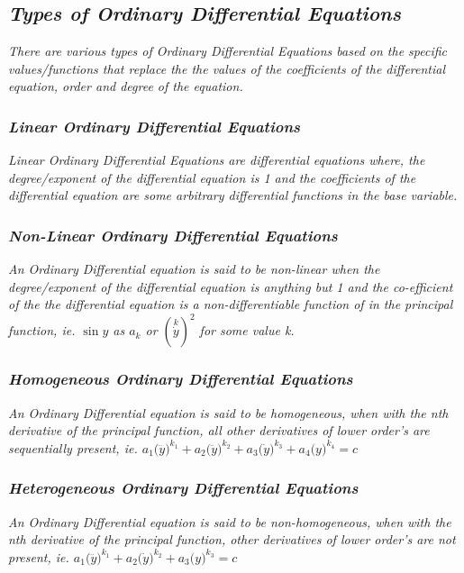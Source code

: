 

\subsection{\textit{Types of Ordinary Differential Equations}}
	
	\textit{There are various types of Ordinary Differential Equations based on the specific values/functions that replace the the values of the coefficients of the differential equation, order and degree of the equation.}	
	
	\subsubsection{\textit{Linear Ordinary Differential Equations}}

		\textit{Linear Ordinary Differential Equations are differential equations where, the degree/exponent of the differential equation is 1 and the coefficients of the differential equation are some arbitrary differential functions in the base variable.}

	\subsubsection{\textit{Non-Linear Ordinary Differential Equations}}

		\textit{An Ordinary Differential equation is said to be non-linear when the degree/exponent of the differential equation is anything but 1 and the co-efficient of the the differential equation is a non-differentiable function of in the principal function, ie. $\sin{y}$ as $a_k$ or $\left(\overset{k}{\dot{y}}\right)^2$ for some value k.}

	\subsubsection{\textit{Homogeneous Ordinary Differential Equations}}

		\textit{An Ordinary Differential equation is said to be homogeneous, when with the nth derivative of the principal function, all other derivatives of lower order's are sequentially present, ie. $a_{1}\bigg(\dddot{y}\bigg)^{k_1} + a_{2}\bigg(\ddot{y}\bigg)^{k_2} + a_{3}\bigg(\dot{y}\bigg)^{k_3} + a_{4}\bigg(y\bigg)^{k_4} = c$}

	\subsubsection{\textit{Heterogeneous Ordinary Differential Equations}}

	\textit{An Ordinary Differential equation is said to be non-homogeneous, when with the nth derivative of the principal function, other derivatives of lower order's are not present, ie. $a_{1}\bigg(\dddot{y}\bigg)^{k_1} + a_{2}\bigg(\dot{y}\bigg)^{k_2} + a_{3}\bigg(y\bigg)^{k_3} = c$}


